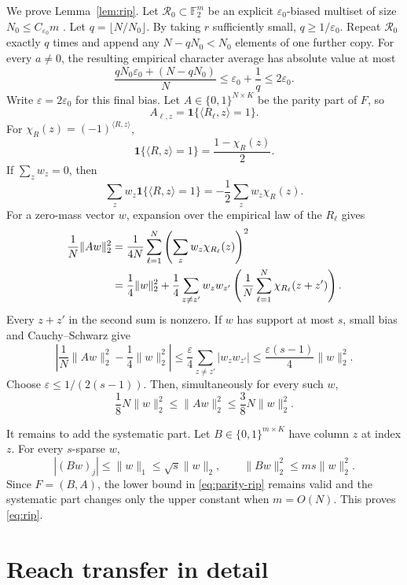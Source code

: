 \documentclass{article}
\theoremstyle{definition}
\theoremstyle{remark}
\newcommand{\Ftwo}{\mathbb F_2}
\newcommand{\1}{\mathbf 1}
\begin{document}
We prove Lemma~\ref{lem:rip}. Let $\mathcal R_0\subset\Ftwo^m$ be an explicit $\varepsilon_0$-biased multiset of size $N_0\leq C_{\varepsilon_0}m$ \citep{naor1993smallbias,tashma2017balanced}. Let $q=\lfloor N/N_0\rfloor$. By taking $r$ sufficiently small, $q\geq1/\varepsilon_0$. Repeat $\mathcal R_0$ exactly $q$ times and append any $N-qN_0<N_0$ elements of one further copy. For every $a\ne0$, the resulting empirical character average has absolute value at most \[ \frac{qN_0\varepsilon_0+(N-qN_0)}N\leq\varepsilon_0+\frac1q\leq2\varepsilon_0. \] Write $\varepsilon=2\varepsilon_0$ for this final bias. Let $A\in\{0,1\}^{N\times K}$ be the parity part of $F$, so \[ A_{\ell,z}=\mathbf1\{\langle R_\ell,z\rangle=1\}. \] For $\chi_R(z)=(-1)^{\langle R,z\rangle}$, \[ \mathbf1\{\langle R,z\rangle=1\}=\frac{1-\chi_R(z)}2. \] If $\sum_z w_z=0$, then \[ \sum_z w_z\mathbf1\{\langle R,z\rangle=1\} =-\frac12\sum_z w_z\chi_R(z). \] For a zero-mass vector $w$, expansion over the empirical law of the $R_\ell$ gives
\begin{align}
\frac1N\|Aw\|_2^2
&=\frac1{4N}\sum_{\ell=1}^N\left(\sum_z w_z\chi_{R_\ell}(z)\right)^2 \notag\\
&=\frac14\|w\|_2^2+
\frac14\sum_{z\ne z'}w_zw_{z'}
\left(\frac1N\sum_{\ell=1}^N\chi_{R_\ell}(z+z')\right).
\label{eq:small-bias-expansion}
\end{align}
Every $z+z'$ in the second sum is nonzero. If $w$ has support at most $s$, small bias and Cauchy--Schwarz give \[ \left|\frac1N\|Aw\|_2^2-\frac14\|w\|_2^2\right| \leq\frac\varepsilon4\sum_{z\ne z'}|w_zw_{z'}| \leq\frac{\varepsilon(s-1)}4\|w\|_2^2. \] Choose $\varepsilon\leq1/(2(s-1))$. Then, simultaneously for every such $w$,
\begin{equation}
\frac18N\|w\|_2^2\leq\|Aw\|_2^2\leq\frac38N\|w\|_2^2.
\label{eq:parity-rip}
\end{equation}

It remains to add the systematic part. Let $B\in\{0,1\}^{m\times K}$ have column $z$ at index $z$. For every $s$-sparse $w$, \[ |(Bw)_j|\leq\|w\|_1\leq\sqrt s\|w\|_2, \qquad \|Bw\|_2^2\leq ms\|w\|_2^2. \] Since $F=(B,A)$, the lower bound in \eqref{eq:parity-rip} remains valid and the systematic part changes only the upper constant when $m=O(N)$. This proves \eqref{eq:rip}.

\section{Reach transfer in detail}
\label{app:reach}
\end{document}
